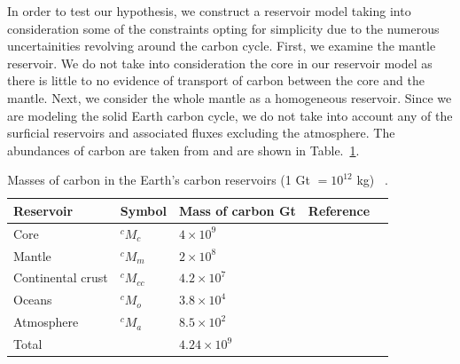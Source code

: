 In order to test our hypothesis, we construct a reservoir model taking into consideration some of the constraints opting for simplicity due to the numerous uncertainities revolving around the carbon cycle. First, we examine the mantle reservoir. We do not take into consideration the core in our reservoir model as there is little to no evidence of transport of carbon between the core and the mantle. Next, we consider the whole mantle as a homogeneous reservoir. Since we are modeling the solid Earth carbon cycle, we do not take into account any of the surficial reservoirs and associated fluxes excluding the atmosphere. The abundances of carbon are taken from \citet{KLH-TDL-WM:2017} and are shown in Table.~\ref{Table:Masses of carbon in Earth's reservoirs}.

{\renewcommand{\arraystretch}{2.0}%
\begin{table}[b!]
    \centering
    \begin{tabular}{|l|l|l|c|c|}
        \hline
        Reservoir & Symbol & Mass of carbon Gt & Reference \\
        \hline
        Core   & $^cM_c$ & $4 \times 10^9$ & ~\citet{DR:2013}  \\
        \hline
        Mantle & $^cM_m$ & $2 \times 10^8$ & ~\citet{KLH-TDL-WM:2017}  \\
        \hline
        Continental crust & $^cM_{cc}$ & $4.2 \times 10^7$ & ~\citet{KHW:1995} \\
        \hline
        Oceans & $^cM_o$ & $3.8 \times 10^4$ & ~\citet{HRA:2007} \\
        \hline
        Atmosphere & $^cM_a$ & $8.5 \times 10^2$ & ~\citet{NOAA:2017} \\
        \hline
        Total & & $4.24 \times 10^9$ & \\
        \hline
    \end{tabular}
    \caption{\doublespacing Masses of carbon in the Earth's carbon reservoirs (1 Gt $= 10^{12}$ kg) ~\cite{KLH-TDL-WM:2017}.
    }
    \label{Table:Masses of carbon in Earth's reservoirs}
\end{table}

}
